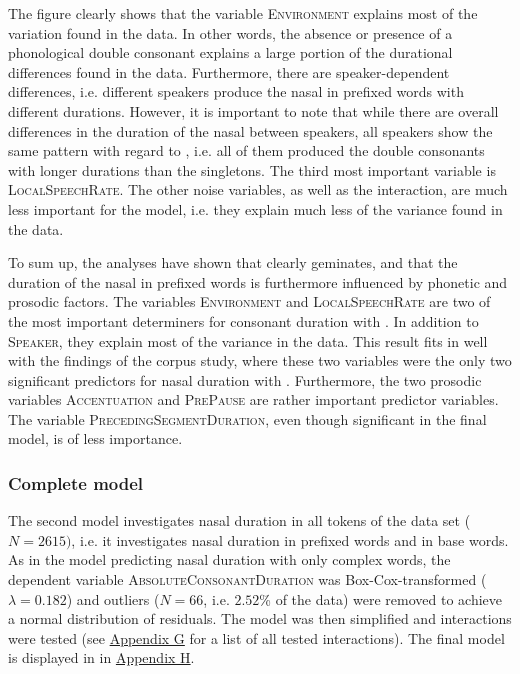 The figure clearly shows that the variable \textsc{Environment} explains most of the variation found in the data. In other words, the absence or presence of a phonological double consonant explains a large portion of the durational differences found in the data.
Furthermore, there are speaker-dependent differences, i.e. different speakers produce the nasal in prefixed words with different durations. However, it is important to note that while there are overall differences in the duration of the nasal between speakers, all speakers show the same pattern with regard to , i.e. all of them produced the double consonants with longer durations than the singletons. 
The third most important variable is \textsc{LocalSpeechRate}. The other noise variables, as well as the interaction, are much less important for the model, i.e. they explain much less of the variance found in the data.


To sum up, the analyses have shown that  clearly geminates, and that the duration of the nasal in prefixed words is furthermore influenced by phonetic and prosodic factors.
The variables \textsc{Environment} and \textsc{LocalSpeechRate} are two of the most important determiners for consonant duration with . In addition to \textsc{Speaker}, they explain most of the variance in the data. This result fits in well with the findings of the corpus study, where these two variables were the only two significant predictors for nasal duration with . 
Furthermore, the two prosodic variables \textsc{Accentuation} and \textsc{PrePause} are rather important predictor variables. The variable \textsc{PrecedingSegmentDuration}, even though significant in the final model, is of less importance. 



\subsubsection{Complete model}\largerpage[-1]

The second model investigates nasal duration in all tokens of the data set ($N=2615)$, i.e. it investigates nasal duration in prefixed words and in base words. 
As in the model predicting nasal duration with only complex words, the dependent variable \textsc{AbsoluteConsonantDuration} was Box-Cox-transformed ($\lambda= 0.182$) and outliers ($N=66$, i.e. $ 2.52$\% of the data) were removed to achieve a normal distribution of residuals. The model was then simplified and interactions were tested (see \hyperref[Appendix G Summaries of tested interactions in experimental study]{Appendix G} for a list of all tested interactions). The final model is displayed in  in \hyperref[Appendix H: Model Summaries Experiment]{Appendix H}.


